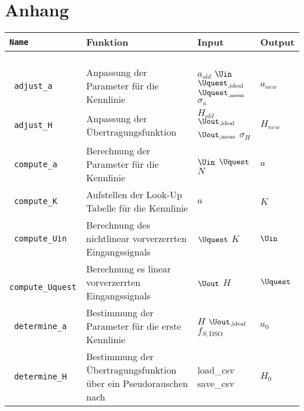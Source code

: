\documentclass[../Report.tex]{subfiles}
\begin{document}
\chapter{Anhang}
\label{chap:anhang}
\begin{table}[H]
\centering 
\begin{tabular}[t]{| >{\texttt\bgroup}m{3.5cm}<{\egroup}|m{8cm}|m{2cm}|m{2cm}|} 
  \hline
    \textrm{\textbf{Name}} & \textbf{Funktion} & \textbf{Input} & \textbf{Output} \\ 
  \hline \hline
    \multicolumn{4}{|c|}{blocks} \\
  \hline \hline
  adjust\_a & Anpassung der Parameter für die Kennlinie & $a_{old}$ \newline $\Uin$ \newline $\Uquest_{,\textrm{ideal}}$ \newline $\Uquest_{,\textrm{meas}}$ \newline $\sigma_a$ & $a_{new}$\\
  \hline
  adjust\_H & Anpassung der Übertragungsfunktion & $H_{old}$ \newline $\Uout_{,\textrm{ideal}}$ \newline $\Uout_{,\textrm{meas}}$ \newline $\sigma_H$ & $H_{new}$\\
  \hline
  compute\_a & Berechnung der Parameter für die Kennlinie & $\Uin$ \newline $\Uquest$ \newline $N$ & $a$\\
  \hline
  compute\_K & Aufstellen der Look-Up Tabelle für die Kennlinie & $a$ & $K$\\
  \hline
  compute\_Uin & Berechnung des nichtlinear vorverzerrten Eingangssignals & $\Uquest$ \newline $K$ & $\Uin$\\
  \hline
  compute\_Uquest & Berechnung es linear vorverzerrten Eingangssignals & $\Uout$ \newline $H$ & $\Uquest$\\
  \hline
  determine\_a & Bestimmung der Parameter für die erste Kennlinie & $H$ \newline $\Uout_{,\textrm{ideal}}$ \newline $f_{S,\textrm{DSO}}$ & $a_0$\\
  \hline
  determine\_H & Bestimmung der Übertragungsfunktion über ein Pseudorauschen nach \cite{PJS_Denys} & load\_csv \newline save\_csv  & $H_0$\\

\end{tabular}
\end{table}
\end{document}
